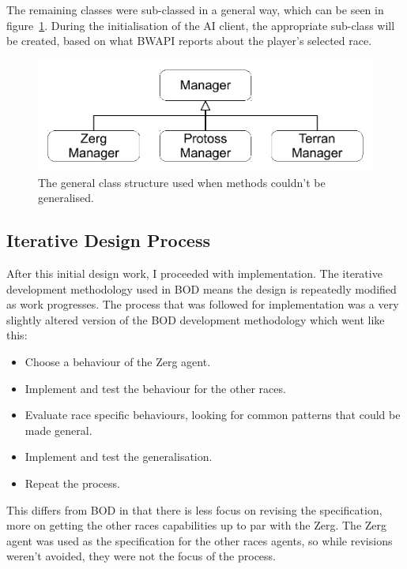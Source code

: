 \documentclass[11pt,openright,a4paper]{report}
\begin{document}
The remaining classes were sub-classed in a general way, which can be seen in figure~\ref{fig:GeneralStructure}. During the initialisation of the AI client, the appropriate sub-class will be created, based on what BWAPI reports about the player's selected race.

\begin{figure}[h]
    \centering
    \includegraphics[scale=0.5]{GeneralStructure}
    \caption{The general class structure used when methods couldn't be generalised.}
    \label{fig:GeneralStructure}
\end{figure}

\subsection{Iterative Design Process}
After this initial design work, I proceeded with implementation. The iterative development methodology used in BOD means the design is repeatedly modified as work progresses. The process that was followed for implementation was a very slightly altered version of the BOD development methodology which went like this:
\begin{itemize}
\item{Choose a behaviour of the Zerg agent.}
\item{Implement and test the behaviour for the other races.}
\item{Evaluate race specific behaviours, looking for common patterns that could be made general.}
\item{Implement and test the generalisation.}
\item{Repeat the process.}
\end{itemize}

 This differs from BOD in that there is less focus on revising the specification, more on getting the other races capabilities up to par with the Zerg. The Zerg agent was used as the specification for the other races agents, so while revisions weren't avoided, they were not the focus of the process.
\end{document}
